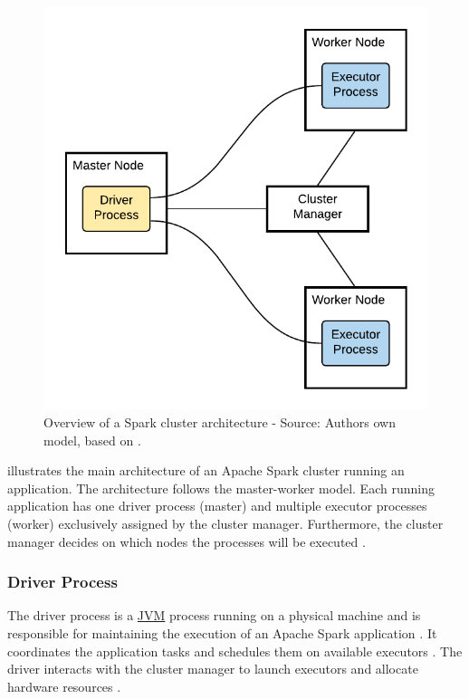 \begin{figure}[h]
\centering
\includegraphics[scale=1]{images/04_technical_background/spark/spark_cluster_architecture}
\caption{Overview of a Spark cluster architecture - Source: Authors own model, based on \cite{Apache2020Spark}.}
\label{fig:spark_cluster_overview}
\end{figure}

 illustrates the main architecture of an Apache Spark cluster running an application.
The architecture follows the master-worker model.
Each running application has one driver process (master) and multiple executor processes (worker) exclusively assigned by the cluster manager.
Furthermore, the cluster manager decides on which nodes the processes will be executed \cite{Hien2018Spark}.


\subsubsection{Driver Process}
\label{subsubsec:04_spark_architecture_driver}
The driver process is a \hyperlink{abbr:jvm}{JVM} process running on a physical machine and is responsible for maintaining the execution of an Apache Spark application \cite{Chambers2018Spark}. It coordinates the application tasks and schedules them on available executors \cite{Hien2018Spark}. 
The driver interacts with the cluster manager to launch executors and allocate hardware resources \cite{Chambers2018Spark, Hien2018Spark}.


